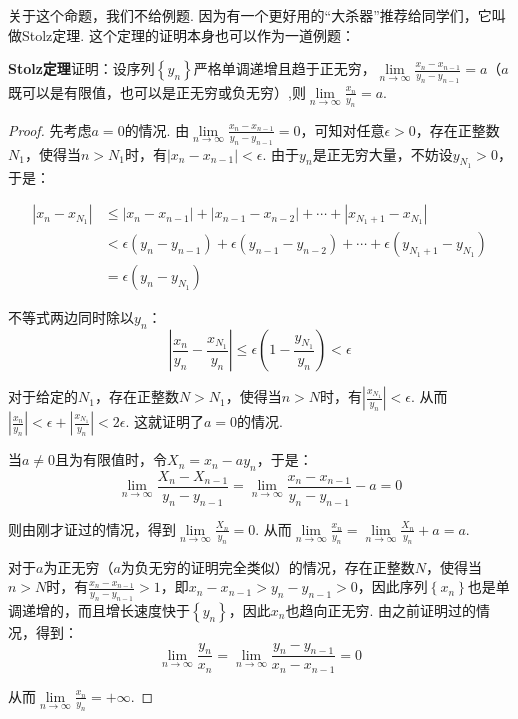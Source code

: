关于这个命题，我们不给例题. 因为有一个更好用的“大杀器”推荐给同学们，它叫做Stolz定理. 这个定理的证明本身也可以作为一道例题：

\begin{example}
\label{ex:ch01-30}
\textbf{Stolz定理}\quad 证明：设序列$\left\{ y_{n} \right\}$严格单调递增且趋于正无穷，$\lim\limits_{n \to \infty} \displaystyle\frac{x_{n}-x_{n-1}}{y_{n}-y_{n-1}}=a$（$a$既可以是有限值，也可以是正无穷或负无穷）,则$\lim\limits_{n \to \infty} \displaystyle\frac{x_{n}}{y_{n}}=a$.
\end{example}

\begin{proof}
先考虑$a=0$的情况.
由$\lim\limits_{n \to \infty} \displaystyle\frac{x_{n}-x_{n-1}}{y_{n}-y_{n-1}}=0$，可知对任意$\epsilon>0$，存在正整数$N_{1}$，使得当$n>N_{1}$时，有$|x_{n}-x_{n-1}|<\epsilon$. 由于$y_{n}$是正无穷大量，不妨设$y_{N_{1}}>0$，于是：

\begin{equation}
    \begin{aligned}
        |x_{n}-x_{N_{1}}|
        &\le |x_{n}-x_{n-1}|+|x_{n-1}-x_{n-2}|+ \cdots +|x_{N_{1}+1}-x_{N_{1}}| \\
        &< \epsilon(y_{n}-y_{n-1})+\epsilon(y_{n-1}-y_{n-2})+ \cdots +\epsilon(y_{N_{1}+1}-y_{N_{1}}) \\
        &= \epsilon(y_{n}-y_{N_{1}})
        \nonumber
    \end{aligned}
\end{equation}\par
不等式两边同时除以$y_{n}$：
$$
\left| \frac{x_{n}}{y_{n}} - \frac{x_{N_{1}}}{y_{n}}\right|
\le \epsilon \left( 1-\frac{y_{N_{1}}}{y_{n}} \right)
<\epsilon
$$

对于给定的$N_{1}$，存在正整数$N>N_{1}$，使得当$n>N$时，有$\left| \displaystyle\frac{x_{N_{1}}}{y_{n}}\right|<\epsilon$. 从而$\left|\displaystyle\frac{x_{n}}{y_{n}} \right|< \epsilon + \left| \displaystyle\frac{x_{N_{1}}}{y_{n}}\right| <2\epsilon $. 这就证明了$a=0$的情况.

当$a\ne 0$且为有限值时，令$X_{n}=x_{n}-ay_{n}$，于是：
$$
\lim\limits_{n \to \infty} \frac{X_{n}-X_{n-1}}{y_{n}-y_{n-1}} =
\lim\limits_{n \to \infty} \frac{x_{n}-x_{n-1}}{y_{n}-y_{n-1}} -a = 0
$$

则由刚才证过的情况，得到$\lim\limits_{n \to \infty}\displaystyle\frac{X_{n}}{y_{n}}=0$. 从而$\lim\limits_{n \to \infty}\displaystyle\frac{x_{n}}{y_{n}}= \lim\limits_{n \to \infty}\displaystyle\frac{X_{n}}{y_{n}}+a=a$.

对于$a$为正无穷（$a$为负无穷的证明完全类似）的情况，存在正整数$N$，使得当$n>N$时，有$\displaystyle\frac{x_{n}-x_{n-1}}{y_{n}-y_{n-1}}>1$，即$x_{n}-x_{n-1}>y_{n}-y_{n-1}>0$，因此序列$\left\{ x_{n} \right\}$也是单调递增的，而且增长速度快于$\left\{ y_{n} \right\}$，因此$x_{n}$也趋向正无穷. 由之前证明过的情况，得到：
$$
\lim\limits_{n \to \infty}\frac{y_{n}}{x_{n}} =
\lim\limits_{n \to \infty} \frac{y_{n}-y_{n-1}}{x_{n}-x_{n-1}} =0
$$\par
从而$\lim\limits_{n \to \infty} \displaystyle\frac{x_{n}}{y_{n}}=+\infty$.
\end{proof}

